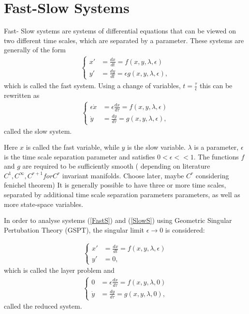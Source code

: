 


\section{Fast-Slow Systems}\label{Intro}
Fast- Slow systems are systems of differential equations that can be viewed on two different time scales, which are separated by a parameter.
These systems are generally of the form
\begin{align} \label{FastS}
\begin{cases}
x' &=\frac{dx}{dt}= f(x,y,\lambda, \epsilon)\\
y' &= \frac{dy}{dt}= \epsilon g( x,y, \lambda, \epsilon),
\end{cases}
\end{align}
which is called the fast system.
Using a change of variables, $t = \frac{\tau}{\epsilon} $ this can be rewritten as
\begin{align}
\begin{cases}
\epsilon \dot{x} &= \epsilon \frac{dx}{d \tau} = f(x,y,\lambda, \epsilon)\\
\dot{y} & = \frac{dy}{d \tau} =  g( x,y, \lambda, \epsilon),
\end{cases}\label{SlowS}
\end{align}
called the slow system.

Here $x$ is called the fast variable, while $y$ is the slow variable. $\lambda$ is a parameter, $\epsilon$ is the time scale separation parameter and satisfies $0< \epsilon << 1$. The functions $f$ and $g$ are required to be sufficiently smooth ( depending on literature $C^1, C^\infty, C^{r+1} for C^r$ invariant manifolds. Choose later, maybe $C^r$ considering fenichel theorem)
It is generally possible to have three or more time scales, separated by additional time scale separation parameters parameters, as well as more state-space variables. 

In order to analyse systems (\ref{FastS}) and (\ref{SlowS}) using Geometric Singular Pertubation Theory (GSPT), the singular limit $\epsilon \to 0$ is considered:

\begin{align} \label{FastS0}
\begin{cases}
x' &=\frac{dx}{dt}= f(x,y,\lambda, \epsilon)\\
y' &= 0,
\end{cases}
\end{align}
which is called the layer problem and
\begin{align}\label{SlowS0}
\begin{cases}
0 &= \epsilon \frac{dx}{d \tau} = f(x,y,\lambda, 0)\\
\dot{y} & = \frac{dy}{d \tau} =  g( x,y, \lambda,0),
\end{cases}
\end{align}
called the reduced system.

